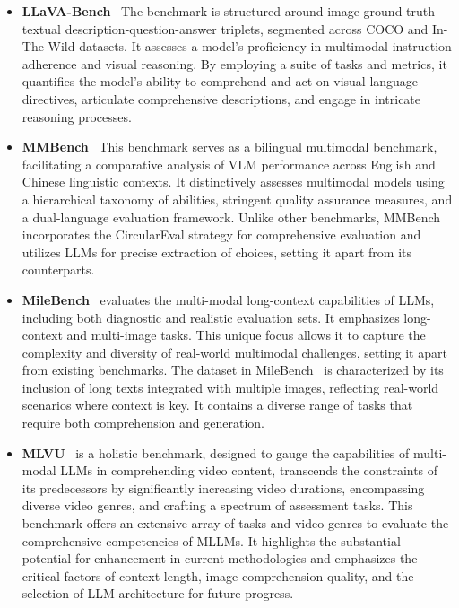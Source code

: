 \begin{itemize}[leftmargin=10pt]
    \item \textbf{LLaVA-Bench}~\cite{liu2023llava}
The benchmark is structured around image-ground-truth textual description-question-answer triplets, segmented across COCO and In-The-Wild datasets. It assesses a model's proficiency in multimodal instruction adherence and visual reasoning. By employing a suite of tasks and metrics, it quantifies the model's ability to comprehend and act on visual-language directives, articulate comprehensive descriptions, and engage in intricate reasoning processes.

\item \textbf{MMBench}~\cite{MMBench}
This benchmark serves as a bilingual multimodal benchmark, facilitating a comparative analysis of VLM performance across English and Chinese linguistic contexts. It distinctively assesses multimodal models using a hierarchical taxonomy of abilities, stringent quality assurance measures, and a dual-language evaluation framework. Unlike other benchmarks, MMBench~\cite{MMBench} incorporates the CircularEval strategy for comprehensive evaluation and utilizes LLMs for precise extraction of choices, setting it apart from its counterparts.

\item \textbf{MileBench}~\cite{song2024milebench}
evaluates the multi-modal long-context capabilities of LLMs, including both diagnostic and realistic evaluation sets. It emphasizes long-context and multi-image tasks. This unique focus allows it to capture the complexity and diversity of real-world multimodal challenges, setting it apart from existing benchmarks. The dataset in MileBench~\cite{song2024milebench} is characterized by its inclusion of long texts integrated with multiple images, reflecting real-world scenarios where context is key. It contains a diverse range of tasks that require both comprehension and generation. %

\item \textbf{MLVU}~\cite{MLVU}
is a holistic benchmark, designed to gauge the capabilities of multi-modal LLMs in comprehending  video content, transcends the constraints of its predecessors by significantly increasing video durations, encompassing diverse video genres, and crafting a spectrum of assessment tasks. This benchmark offers an extensive array of tasks and video genres to evaluate the comprehensive competencies of MLLMs. It highlights the substantial potential for enhancement in current methodologies and emphasizes the critical factors of context length, image comprehension quality, and the selection of LLM architecture for future progress.


\end{itemize}
